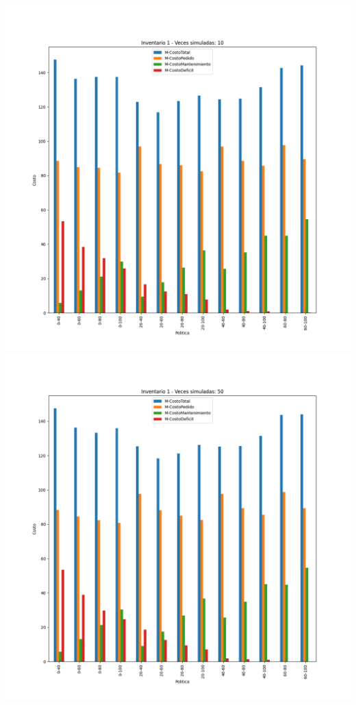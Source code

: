 \documentclass[11pt,a4paper]{report}
\begin{document}
\begin{center}
	\includegraphics[width=0.45\textheight]{img/Cap-2/inventario-1/inventario1-10veces.png}
	\includegraphics[width=0.45\textheight]{img/Cap-2/inventario-1/inventario1-50veces.png}

\end{center}
\end{document}
